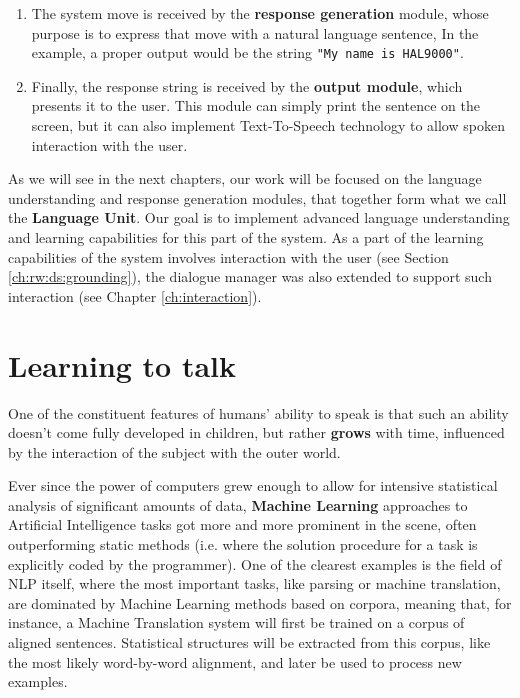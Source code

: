 \begin{enumerate}
	\item The system move is received by the \textbf{response generation} module, whose purpose is to express that move with a natural language sentence, In the example, a proper output would be the string \texttt{"My name is HAL9000"}.
	\item Finally, the response string is received by the \textbf{output module}, which presents it to the user. This module can simply print the sentence on the screen, but it can also implement Text-To-Speech technology to allow spoken interaction with the user.
\end{enumerate}

As we will see in the next chapters, our work will be focused on the language understanding and response generation modules, that together form what we call the \textbf{Language Unit}. Our goal is to implement advanced language understanding and learning capabilities for this part of the system. As a part of the learning capabilities of the system involves interaction with the user (see Section \ref{ch:rw:ds:grounding}), the dialogue manager was also extended to support such interaction (see Chapter \ref{ch:interaction}).



\section{Learning to talk}

One of the constituent features of humans' ability to speak is that such an ability doesn't come fully developed in children, but rather \textbf{grows} with time, influenced by the interaction of the subject with the outer world.

Ever since the power of computers grew enough to allow for intensive statistical analysis of significant amounts of data, \textbf{Machine Learning} approaches to Artificial Intelligence tasks got more and more prominent in the scene, often outperforming static methods (i.e. where the solution procedure for a task is explicitly coded by the programmer).
One of the clearest examples is the field of NLP itself, where the most important tasks, like parsing or machine translation, are dominated by Machine Learning methods based on corpora,
meaning that, for instance, a Machine Translation system will first be trained on a corpus of aligned sentences. Statistical structures will be extracted from this corpus, like the most likely word-by-word alignment, and later be used to process new examples.

